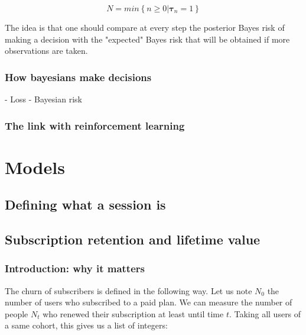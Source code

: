 \documentclass{tufte-book}
\begin{document}
\begin{equation}
  N = min\left\{n\geq0 | \mathbf{\tau}_n = 1\right\}
\end{equation}

The idea is that one should compare at every step the posterior Bayes risk of making a decision with the
"expected" Bayes risk that will be obtained if more observations are taken.



    \subsection{How bayesians make decisions}%
    \label{sub:how_bayesians_make_decisions}

- Loss
- Bayesian risk

    \subsection{The link with reinforcement learning}%
    \label{sub:the_link_with_reinforcement_learning}



\chapter{Models}
\label{chap:models}

  \section{Defining what a session is}%
  \label{sec:defining_what_a_session_is}
  
  
  \section{Subscription retention and lifetime value}%
  \label{sec:churn_of_subscription_and_lifetime_value}


    \subsection{Introduction: why it matters}%
    \label{sub:introduction_why_it_matters}
  
  
The churn of subscribers is defined in the following way. Let us note $N_0$ the number of users who subscribed
to a paid plan. We can measure the number of people $N_t$ who renewed their subscription at least until time
$t$. Taking all users of a same cohort, this gives us a list of integers:
\end{document}
